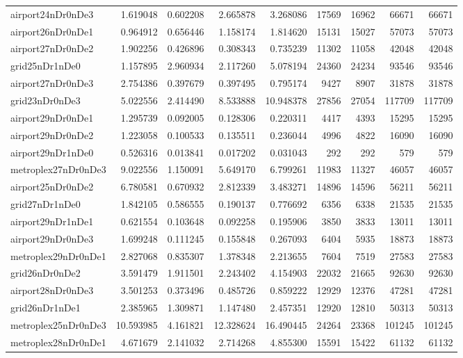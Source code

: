 \begin{longtable}{|l|r|r|r|r|r|r|r|r|}
airport24nDr0nDe3 & 1.619048 & 0.602208 & 2.665878 & 3.268086 & 17569 & 16962 & 66671 & 66671 \\
airport26nDr0nDe1 & 0.964912 & 0.656446 & 1.158174 & 1.814620 & 15131 & 15027 & 57073 & 57073 \\
airport27nDr0nDe2 & 1.902256 & 0.426896 & 0.308343 & 0.735239 & 11302 & 11058 & 42048 & 42048 \\
grid25nDr1nDe0 & 1.157895 & 2.960934 & 2.117260 & 5.078194 & 24360 & 24234 & 93546 & 93546 \\
airport27nDr0nDe3 & 2.754386 & 0.397679 & 0.397495 & 0.795174 & 9427 & 8907 & 31878 & 31878 \\
grid23nDr0nDe3 & 5.022556 & 2.414490 & 8.533888 & 10.948378 & 27856 & 27054 & 117709 & 117709 \\
airport29nDr0nDe1 & 1.295739 & 0.092005 & 0.128306 & 0.220311 & 4417 & 4393 & 15295 & 15295 \\
airport29nDr0nDe2 & 1.223058 & 0.100533 & 0.135511 & 0.236044 & 4996 & 4822 & 16090 & 16090 \\
airport29nDr1nDe0 & 0.526316 & 0.013841 & 0.017202 & 0.031043 & 292 & 292 & 579 & 579 \\
metroplex27nDr0nDe3 & 9.022556 & 1.150091 & 5.649170 & 6.799261 & 11983 & 11327 & 46057 & 46057 \\
airport25nDr0nDe2 & 6.780581 & 0.670932 & 2.812339 & 3.483271 & 14896 & 14596 & 56211 & 56211 \\
grid27nDr1nDe0 & 1.842105 & 0.586555 & 0.190137 & 0.776692 & 6356 & 6338 & 21535 & 21535 \\
airport29nDr1nDe1 & 0.621554 & 0.103648 & 0.092258 & 0.195906 & 3850 & 3833 & 13011 & 13011 \\
airport29nDr0nDe3 & 1.699248 & 0.111245 & 0.155848 & 0.267093 & 6404 & 5935 & 18873 & 18873 \\
metroplex29nDr0nDe1 & 2.827068 & 0.835307 & 1.378348 & 2.213655 & 7604 & 7519 & 27583 & 27583 \\
grid26nDr0nDe2 & 3.591479 & 1.911501 & 2.243402 & 4.154903 & 22032 & 21665 & 92630 & 92630 \\
airport28nDr0nDe3 & 3.501253 & 0.373496 & 0.485726 & 0.859222 & 12929 & 12376 & 47281 & 47281 \\
grid26nDr1nDe1 & 2.385965 & 1.309871 & 1.147480 & 2.457351 & 12920 & 12810 & 50313 & 50313 \\
metroplex25nDr0nDe3 & 10.593985 & 4.161821 & 12.328624 & 16.490445 & 24264 & 23368 & 101245 & 101245 \\
metroplex28nDr0nDe1 & 4.671679 & 2.141032 & 2.714268 & 4.855300 & 15591 & 15422 & 61132 & 61132 \\

\end{longtable}
